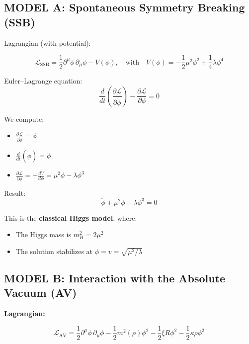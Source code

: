 \documentclass[twoside]{article}
\theoremstyle{definition}
\theoremstyle{remark}
\numberwithin{equation}{section}
\theoremstyle{definition}
\theoremstyle{example}
\theoremstyle{remark}
\numberwithin{equation}{section}%
\begin{document}
		
	\subsection{MODEL A: Spontaneous Symmetry Breaking (SSB)}
	
	Lagrangian (with potential):
	
	\begin{equation}\label{e2}
		\mathcal{L}_{\text{SSB}} = \frac{1}{2} \partial^\mu \phi \, \partial_\mu \phi - V(\phi), \quad \text{with} \quad V(\phi) = -\frac{1}{2} \mu^2 \phi^2 + \frac{1}{4} \lambda \phi^4
	\end{equation}
	
	Euler–Lagrange equation:
	\begin{equation}\label{e3}
		\frac{d}{dt} \left( \frac{\partial \mathcal{L}}{\partial \dot{\phi}} \right) - \frac{\partial \mathcal{L}}{\partial \phi} = 0
	\end{equation}
	
	We compute:
	\begin{itemize}
		\item $\displaystyle \frac{\partial \mathcal{L}}{\partial \dot{\phi}} = \dot{\phi}$
		\item $\displaystyle \frac{d}{dt} ( \dot{\phi} ) = \ddot{\phi}$
		\item $\displaystyle \frac{\partial \mathcal{L}}{\partial \phi} = -\frac{dV}{d\phi} = \mu^2 \phi - \lambda \phi^3$
	\end{itemize}
	
	Result:
	\begin{equation}\label{e5}
		\boxed{ \ddot{\phi} + \mu^2 \phi - \lambda \phi^3 = 0 }
	\end{equation}
	
	This is the \textbf{classical Higgs model}, where:
	\begin{itemize}
		\item The Higgs mass is $ m_H^2 = 2\mu^2 $
		\item The solution stabilizes at $ \phi = v = \sqrt{\mu^2/\lambda} $
	\end{itemize}	       	
	
	\subsection{MODEL B: Interaction with the Absolute Vacuum (AV)}
	
	\textbf{Lagrangian:}
	
	\begin{equation}
		\mathcal{L}_{\text{AV}} = \frac{1}{2} \partial^\mu \phi \, \partial_\mu \phi - \frac{1}{2} m^2(\rho) \phi^2 - \frac{1}{2} \xi R \phi^2 - \frac{1}{2} \kappa \rho \phi^2
	\end{equation}
	
\end{document}
